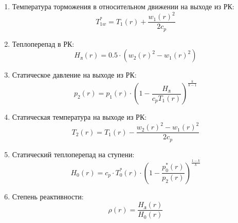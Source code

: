 \documentclass[a4paper,12pt]{article}
\begin{document}
\begin{enumerate}
        \item Температура торможения в относительном движении на выходе из РК:
        \[
            T_{1w}^* = T_1(r) + \frac{w_1(r) ^ 2}{2 c_p}
        \]

        \item Теплоперепад в РК:
        \[
            H_л (r) = 0.5 \cdot (w_2(r)^2 - w_1(r)^2)
        \]

        \item Статическое давление на выходе из РК:
        \[
            p_2 (r) = p_1(r) \cdot \left( 1 - \frac{H_л}{c_p T_1(r)} \right) ^ {\frac{k}{k - 1}}
        \]

        \item Статическая температура на выходе из РК:
        \[
            T_2 (r) = T_1 (r) - \frac{w_2 (r)^2 - w_1(r)^2}{2 c_p}
        \]

        \item Статический теплоперепад на ступени:
        \[
            H_0 (r) = c_p \cdot T_0^*(r) \cdot \left( 1 - \frac{p_0^*(r)}{p_2(r)} \right) ^ {\frac{1 - k}{k}}
        \]

        \item Степень реактивности:
        \[
            \rho (r) = \frac{H_л (r)}{H_0 (r)}
        \]

    \end{enumerate}
%        
%    
\end{document}
